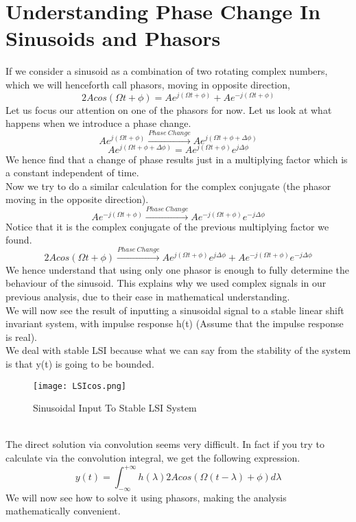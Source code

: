 \section{Understanding Phase Change In Sinusoids and Phasors}
If we consider a sinusoid as a combination of two rotating complex numbers, which we will henceforth call phasors, moving in opposite direction, 
\[
	2Acos(\Omega t + \phi) = Ae^{j(\Omega t + \phi)} + Ae^{-j(\Omega t + \phi)}
\]
Let us focus our attention on one of the phasors for now. Let us look at what happens when we introduce a phase change.\\
\[
Ae^{j(\Omega t + \phi)} \xrightarrow{Phase \ Change} Ae^{j(\Omega t + \phi + \Delta\phi)}
\]
\[
Ae^{j(\Omega t + \phi + \Delta\phi)} =
Ae^{j(\Omega t + \phi)}e^{j\Delta\phi}
\]
We hence find that a change of phase results just in a multiplying factor which is a constant independent of time.\\
Now we try to do a similar calculation for the complex conjugate (the phasor moving in the opposite direction).
\[
Ae^{-j(\Omega t + \phi)} \xrightarrow{Phase \ Change} Ae^{-j(\Omega t + \phi)}e^{-j\Delta\phi}
\]
Notice that it is the complex conjugate of the previous multiplying factor we found.\\
\[
	2Acos(\Omega t + \phi) \xrightarrow{Phase \ Change} Ae^{j(\Omega t + \phi)}e^{j\Delta\phi} + Ae^{-j(\Omega t + \phi)}e^{-j\Delta\phi}
\]
We hence understand that using only one phasor is enough to fully determine the behaviour of the sinusoid. This explains why we used complex signals in our previous analysis, due to their ease in mathematical understanding.\\
We will now see the result of inputting a sinusoidal signal to a stable linear shift invariant system, with impulse response h(t) (Assume that the impulse response is real).\\
We deal with stable LSI because what we can say from the stability of the system is that y(t) is going to be bounded.\\
\begin{figure}[h!]
\begin{center}
\texttt{[image: LSIcos.png]}
\caption{Sinusoidal Input To Stable LSI System}
\end{center}
\end{figure}\\
The direct solution via convolution seems very difficult. In fact if you try to calculate via the convolution integral, we get the following expression.
\[
y(t) = \int_{-\infty}^{+\infty}{h(\lambda)2Acos(\Omega(t-\lambda) + \phi)d\lambda}\]
We will now see how to solve it using phasors, making the analysis mathematically convenient.

